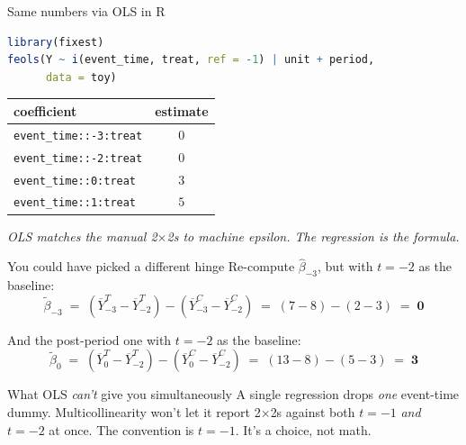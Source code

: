 \documentclass[aspectratio=169,11pt]{beamer}
\begin{document}
\begin{frame}[fragile]{Same numbers via OLS in R}
\vspace{0.5em}
\begin{lstlisting}[language=R,basicstyle=\ttfamily\small]
library(fixest)
feols(Y ~ i(event_time, treat, ref = -1) | unit + period,
      data = toy)
\end{lstlisting}

\vspace{0.6em}
\begin{center}
\renewcommand{\arraystretch}{1.2}
\begin{tabular}{@{}lc@{}}
\toprule
\textbf{coefficient} & \textbf{estimate} \\
\midrule
\texttt{event\_time::-3:treat} & $0$ \\
\texttt{event\_time::-2:treat} & $0$ \\
\texttt{event\_time::0:treat}  & $3$ \\
\texttt{event\_time::1:treat}  & $5$ \\
\bottomrule
\end{tabular}
\end{center}

\vspace{0.5em}
\begin{center}
\small\color{warmgray}\itshape OLS matches the manual 2$\times$2s to machine epsilon. The regression \textit{is} the formula.
\end{center}
\end{frame}

\begin{frame}{You could have picked a different hinge}
\footnotesize
Re-compute $\hat\beta_{-3}$, but with $t = -2$ as the baseline:
\vspace{-0.2em}
\[
\tilde\beta_{-3} \;=\; (\overline{Y}^T_{-3} - \overline{Y}^T_{-2}) - (\overline{Y}^C_{-3} - \overline{Y}^C_{-2}) \;=\; (7 - 8) - (2 - 3) \;=\; \mathbf{0}
\]

\vspace{0.4em}
And the post-period one with $t = -2$ as the baseline:
\vspace{-0.2em}
\[
\tilde\beta_{0} \;=\; (\overline{Y}^T_{0} - \overline{Y}^T_{-2}) - (\overline{Y}^C_{0} - \overline{Y}^C_{-2}) \;=\; (13 - 8) - (5 - 3) \;=\; \mathbf{3}
\]

\vspace{0.6em}
\begin{block}{What OLS \textit{can't} give you simultaneously}
A single regression drops \textit{one} event-time dummy. \;Multicollinearity won't let it report 2$\times$2s against both $t = -1$ \textit{and} $t = -2$ at once. \;The convention is $t = -1$. \;It's a choice, not math.
\end{block}
\end{frame}
\end{document}
